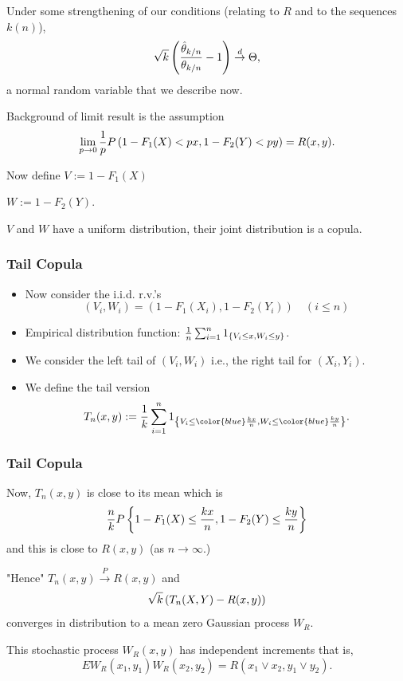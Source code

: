 \documentclass{beamer}
\begin{document}
\begin{frame}
    Under some strengthening of our conditions (relating to $R$ and to the sequences $k(n)$),
    $$
\sqrt{k}\left(\frac{\hat{\theta}_{k/n}}{\theta_{k/n}}-1\right) \stackrel{d}{\to} \Theta,
    $$
 a normal random variable that we describe now.

 Background of limit result is the assumption
$$
\lim_{p\to 0} \frac{1}{p} P\left(1-F_1(X)<px,1-F_2(Y)<py\right) = R(x,y).
$$

Now define $V:=1-F_1(X)$

\quad \quad \quad \quad \quad $W:=1-F_2(Y).$

$V$ and $W$ have a uniform distribution, their joint distribution is a copula.
\end{frame}

\begin{frame}
    \frametitle{Tail Copula}
    \begin{itemize}
        \item     Now consider the i.i.d. r.v.'s
        $$
            (V_i,W_i) = (1-F_1(X_i),1-F_2(Y_i)) \quad (i\le n)
        $$
        \item Empirical distribution function: $\frac{1}{n}\sum_{i=1}^n 1_{\left\{V_i\le x,W_i\le y\right\}}$.
        \item We consider the left tail of $(V_i,W_i)$ i.e., the right tail for $(X_i,Y_i)$.
        \item We define the tail version 
        $$
            T_n(x,y):=\frac{1}{k}\sum_{i=1}^n 1_{\set{V_i\le {\color{blue}\frac{kx}{n}},W_i\le {\color{blue}\frac{ky}{n}}}}.
        $$
    \end{itemize}

    

\end{frame}

\begin{frame}
    \frametitle{Tail Copula}
Now, $T_n(x,y)$ is close to its mean which is
$$
\frac{n}{k}P\left\{1-F_1(X)\le \frac{kx}{n},1-F_2(Y)\le \frac{ky}{n}\right\}
$$
and this is close  to $R(x,y)$ (as $n\to \infty$.)

"Hence" $T_n(x,y)\stackrel{P}{\to} R(x,y)$ and 
$$
\sqrt{k}\left(T_n(X,Y)-R(x,y)\right)
$$
converges in distribution to a mean zero Gaussian
process  $W_R$.

This stochastic process $W_R(x,y)$ has independent
increments that is,
$$
E W_R(x_1,y_1)W_R(x_2,y_2) =R(x_1\vee x_2, y_1 \vee y_2).
$$
\end{frame}
\end{document}

